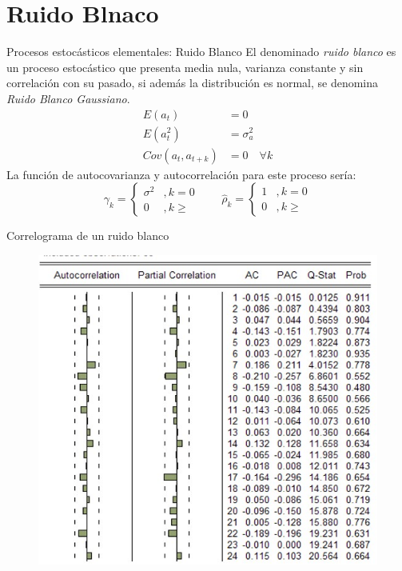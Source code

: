 \section{Ruido Blnaco}

\begin{frame}{Procesos estocásticos elementales: Ruido Blanco}
	El denominado \textit{ruido blanco} es un proceso estocástico que presenta media nula, varianza constante y sin correlación con su pasado, si además la distribución es normal, se denomina \textit{Ruido Blanco Gaussiano}.
	\begin{align*}
		E(a_t) & = 0\\
		E(a_t^2) & = \sigma_{a}^2\\
		Cov(a_t, a_{t+k}) & = 0 \quad \forall k
	\end{align*}
	La función de autocovarianza y autocorrelación para este proceso sería:
	\begin{equation*}
		\gamma_k =	\begin{cases}
			\sigma^2&, k=0 \\
			0 &,  k \geq
		\end{cases} \qquad
		\widehat{\rho}_k =	\begin{cases}
			1 &, k= 0\\
			0 &, k \geq
		\end{cases}
	\end{equation*}
\end{frame}
\begin{frame}{Correlograma de un ruido blanco}
	\centering
	\begin{figure}
		\includegraphics[width = 0.75\linewidth]{fig/figure6.jpg}
	\end{figure}
\end{frame}
